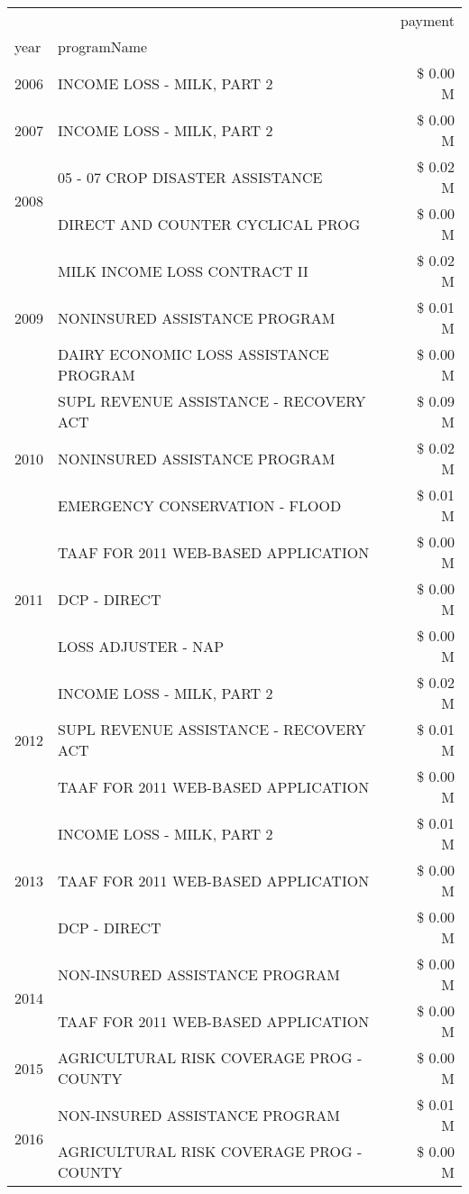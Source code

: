 \begin{tabular}{llr}
\toprule
 &  & payment \\
year & programName &  \\
\midrule
2006 & INCOME LOSS - MILK, PART 2 & \$ 0.00 M \\
\cline{1-3}
2007 & INCOME LOSS - MILK, PART 2 & \$ 0.00 M \\
\cline{1-3}
\multirow[t]{2}{*}{2008} & 05 - 07 CROP DISASTER ASSISTANCE & \$ 0.02 M \\
 & DIRECT AND COUNTER CYCLICAL PROG & \$ 0.00 M \\
\cline{1-3}
\multirow[t]{3}{*}{2009} & MILK INCOME LOSS CONTRACT II & \$ 0.02 M \\
 & NONINSURED ASSISTANCE PROGRAM & \$ 0.01 M \\
 & DAIRY ECONOMIC LOSS ASSISTANCE PROGRAM & \$ 0.00 M \\
\cline{1-3}
\multirow[t]{3}{*}{2010} & SUPL REVENUE ASSISTANCE - RECOVERY ACT & \$ 0.09 M \\
 & NONINSURED ASSISTANCE PROGRAM & \$ 0.02 M \\
 & EMERGENCY CONSERVATION - FLOOD & \$ 0.01 M \\
\cline{1-3}
\multirow[t]{3}{*}{2011} & TAAF FOR 2011 WEB-BASED APPLICATION & \$ 0.00 M \\
 & DCP - DIRECT & \$ 0.00 M \\
 & LOSS ADJUSTER - NAP & \$ 0.00 M \\
\cline{1-3}
\multirow[t]{3}{*}{2012} & INCOME LOSS - MILK, PART 2 & \$ 0.02 M \\
 & SUPL REVENUE ASSISTANCE - RECOVERY ACT & \$ 0.01 M \\
 & TAAF FOR 2011 WEB-BASED APPLICATION & \$ 0.00 M \\
\cline{1-3}
\multirow[t]{3}{*}{2013} & INCOME LOSS - MILK, PART 2 & \$ 0.01 M \\
 & TAAF FOR 2011 WEB-BASED APPLICATION & \$ 0.00 M \\
 & DCP - DIRECT & \$ 0.00 M \\
\cline{1-3}
\multirow[t]{2}{*}{2014} & NON-INSURED ASSISTANCE PROGRAM & \$ 0.00 M \\
 & TAAF FOR 2011 WEB-BASED APPLICATION & \$ 0.00 M \\
\cline{1-3}
2015 & AGRICULTURAL RISK COVERAGE PROG - COUNTY & \$ 0.00 M \\
\cline{1-3}
\multirow[t]{3}{*}{2016} & NON-INSURED ASSISTANCE PROGRAM & \$ 0.01 M \\
 & AGRICULTURAL RISK COVERAGE PROG - COUNTY & \$ 0.00 M \\

\end{tabular}
